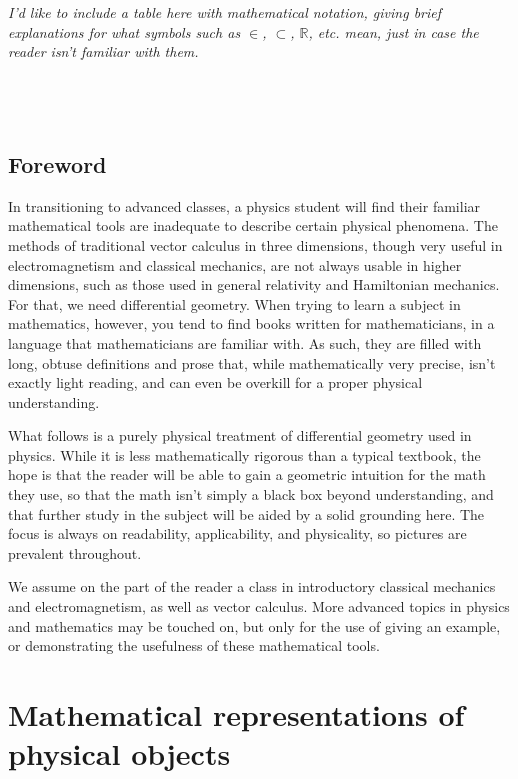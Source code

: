 \documentclass{book}
\begin{document}
\tableofcontents

\emph{I'd like to include a table here with mathematical notation, giving brief explanations for what symbols such as $\in$, $\subset$, $\mathbb{R}$, etc. mean, just in case the reader isn't familiar with them.}\\\\\\\\






\section{Foreword}
In transitioning to advanced classes, a physics student will find their familiar mathematical tools are inadequate to describe certain physical phenomena. The methods of traditional vector calculus in three dimensions, though very useful in electromagnetism and classical mechanics, are not always usable in higher dimensions, such as those used in general relativity and Hamiltonian mechanics. For that, we need differential geometry. When trying to learn a subject in mathematics, however, you tend to find books written for mathematicians, in a language that mathematicians are familiar with. As such, they are filled with long, obtuse definitions and prose that, while mathematically very precise, isn't exactly light reading, and can even be overkill for a proper physical understanding. 

What follows is a purely physical treatment of differential geometry used in physics. While it is less mathematically rigorous than a typical textbook, the hope is that the reader will be able to gain a geometric intuition for the math they use, so that the math isn't simply a black box beyond understanding, and that further study in the subject will be aided by a solid grounding here. The focus is always on readability, applicability, and physicality, so pictures are prevalent throughout. 

We assume on the part of the reader a class in introductory classical mechanics and electromagnetism, as well as vector calculus. More advanced topics in physics and mathematics may be touched on, but only for the use of giving an example, or demonstrating the usefulness of these mathematical tools. 


\chapter{Mathematical representations of physical objects}
\end{document}
